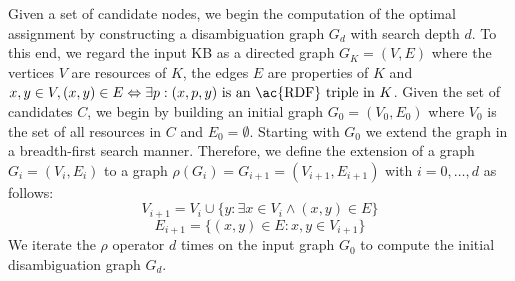 Given a set of candidate nodes, we begin the computation of the optimal assignment by constructing a disambiguation graph $G_d$ with search depth $d$.
To this end, we regard the input \ac{KB} as a directed graph $G_K = (V, E)$ where the vertices $V$ are resources of $K$, the edges $E$ are properties of $K$ and $x,y\in V, (x,y) \in E \Leftrightarrow \exists p : (x, p, y) \mbox{ is an \ac{RDF} triple in }K$.
Given the set of candidates $C$, we begin by building an initial graph $G_0 = (V_0, E_0)$ where $V_0$ is the set of all resources in $C$ and $E_0=\emptyset$. %
Starting with $G_0$ we extend the graph in a breadth-first search manner.
Therefore, we define the extension of a graph $G_i = (V_i, E_i)$ to a graph $\rho(G_i) = G_{i+1} = (V_{i+1}, E_{i+1})$ with $i=0, \ldots, d$ as follows:
\begin{equation}
V_{i+1} = V_i \cup \{y : \exists x \in V_i \wedge (x, y) \in E\}
\end{equation}
\begin{equation}
E_{i+1} = \{(x,y) \in E: x, y \in V_{i+1}\}
\end{equation}
We iterate the $\rho$ operator $d$ times on the input graph $G_0$ to compute the initial disambiguation graph $G_d$.


